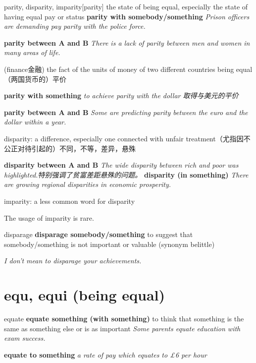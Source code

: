 \begin{DefWord}{parity, disparity, imparity}[parity]
    the state of being equal, especially the state of having equal pay or status
    \textbf{parity with somebody/something} \textit{Prison officers are demanding pay parity with the police force.}

    \textbf{parity between A and B} \textit{There is a lack of parity between men and women in many areas of life.}

    (finance金融) the fact of the units of money of two different countries being equal （两国货币的）平价

    \textbf{parity with something} \textit{ to achieve parity with the dollar 取得与美元的平价}

    \textbf{parity between A and B} \textit{ Some are predicting parity between the euro and the dollar within a year.}

    disparity: a difference, especially one connected with unfair treatment（尤指因不公正对待引起的）不同，不等，差异，悬殊

    \textbf{disparity between A and B} \textit{The wide disparity between rich and poor was highlighted.特别强调了贫富差距悬殊的问题。}
    \textbf{ disparity (in something)} \textit{There are growing regional disparities in economic prosperity.}

    imparity: a less common word for disparity
    \begin{remark}
        The usage of imparity is rare. 
    \end{remark}
\end{DefWord}





\begin{DefWord}{disparage}
    \textbf{disparage somebody/something} to suggest that somebody/something is not important or valuable
    (synonym belittle)

    \textit{I don't mean to disparage your achievements.}
\end{DefWord}






\section{equ, equi (being equal)}

\begin{DefWord}{equate}
    \textbf{equate something (with something)} to think that something is the same as something else or is as important
    \textit{Some parents equate education with exam success.}

    \textbf{equate to something}
    \textit{a rate of pay which equates to £6 per hour}
\end{DefWord}

